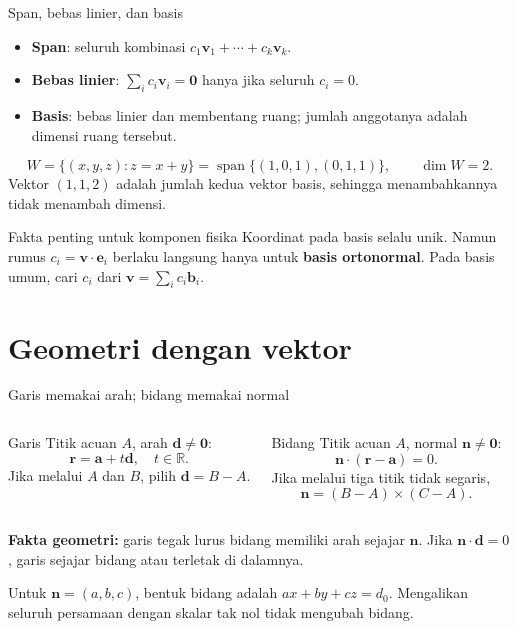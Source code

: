 \documentclass[11pt,aspectratio=169]{beamer}
\newcommand{\vect}[1]{\boldsymbol{#1}}
\newcommand{\R}{\mathbb{R}}
\DeclareMathOperator{\Span}{span}
\begin{document}
\begin{frame}{Span, bebas linier, dan basis}
\small
\begin{itemize}
\item \textbf{Span}: seluruh kombinasi $c_1\vect{v}_1+\cdots+c_k\vect{v}_k$.
\item \textbf{Bebas linier}: $\sum_i c_i\vect{v}_i=\vect{0}$ hanya jika seluruh $c_i=0$.
\item \textbf{Basis}: bebas linier dan membentang ruang;
jumlah anggotanya adalah dimensi ruang tersebut.
\end{itemize}
\[
W=\{(x,y,z):z=x+y\}
=\Span\{(1,0,1),(0,1,1)\},\qquad \dim W=2.
\]
Vektor $(1,1,2)$ adalah jumlah kedua vektor basis, sehingga menambahkannya
tidak menambah dimensi.
\begin{block}{Fakta penting untuk komponen fisika}
Koordinat pada basis selalu unik. Namun rumus $c_i=\vect{v}\cdot\vect{e}_i$
berlaku langsung hanya untuk \textbf{basis ortonormal}.
Pada basis umum, cari $c_i$ dari $\vect{v}=\sum_i c_i\vect{b}_i$.
\end{block}
\end{frame}

\section{Geometri dengan vektor}

\begin{frame}{Garis memakai arah; bidang memakai normal}
\begin{columns}[T,onlytextwidth]
\begin{block}{Garis}
Titik acuan $A$, arah $\vect{d}\ne\vect{0}$:
\[
\vect{r}=\vect{a}+t\vect{d},\quad t\in\R.
\]
Jika melalui $A$ dan $B$, pilih $\vect{d}=B-A$.
\end{block}
\begin{block}{Bidang}
Titik acuan $A$, normal $\vect{n}\ne\vect{0}$:
\[
\vect{n}\cdot(\vect{r}-\vect{a})=0.
\]
Jika melalui tiga titik tidak segaris,
\[
\vect{n}=(B-A)\times(C-A).
\]
\end{block}
\end{columns}
\medskip\small
\textbf{Fakta geometri:} garis tegak lurus bidang memiliki arah sejajar
$\vect{n}$. Jika $\vect{n}\cdot\vect{d}=0$, garis sejajar bidang atau terletak di dalamnya.
\medskip

Untuk $\vect{n}=(a,b,c)$, bentuk bidang adalah $ax+by+cz=d_0$.
Mengalikan seluruh persamaan dengan skalar tak nol tidak mengubah bidang.
\end{frame}
\end{document}
